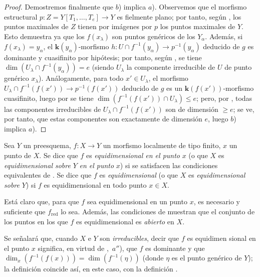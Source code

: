 \begin{proof}
Demostremos finalmente que $b$) implica $a$).
Observemos que el morfismo estructural $p:Z=Y[T_1,\ldots,T_e]\to Y$ es fielmente plano; por tanto, según , los puntos maximales de $Z$ tienen por imágenes por $p$ los puntos maximales de $Y$. Esto demuestra ya que los $f(x_\lambda)$ son puntos genéricos de los $Y_\alpha$.
Además, si $f(x_\lambda)=y_\alpha$, el $\boldsymbol{k}(y_\alpha)$-morfismo $h:U\cap f^{-1}(y_\alpha)\to p^{-1}(y_\alpha)$ deducido de $g$ es dominante y cuasifinito por hipótesis; por tanto, según , se tiene $\dim(U_\lambda\cap f^{-1}(y_\alpha))=e$ (siendo $U_\lambda$ la componente irreducible de $U$ de punto genérico $x_\lambda$).
Análogamente, para todo $x'\in U_\lambda$, el morfismo $U_\lambda\cap f^{-1}(f(x'))\to p^{-1}(f(x'))$ deducido de $g$ es un $\boldsymbol{k}(f(x'))$-morfismo cuasifinito, luego por  se tiene $\dim(f^{-1}(f(x'))\cap U_\lambda)\leq e$; pero, por , todas las componentes irreducibles de $U_\lambda\cap f^{-1}(f(x'))$ son de dimensión $\geq e$; se ve, por tanto, que estas componentes son exactamente de dimensión $e$, luego $b$) implica $a$).
\end{proof}

\begin{definition}[13.3.2]
\label{IV.13.3.2}
Sea $Y$ un preesquema, $f:X\to Y$ un morfismo localmente de tipo finito, $x$ un punto de $X$.
Se dice que $f$ es \emph{equidimensional en el punto} $x$ (o que $X$ es \emph{equidimensional sobre} $Y$ \emph{en el punto} $x$) si se satisfacen las condiciones equivalentes de .
Se dice que $f$ es \emph{equidimensional} (o que $X$ es \emph{equidimensional sobre} $Y$) si $f$ es equidimensional en todo punto $x\in X$.
\end{definition}

Está claro que, para que $f$ sea equidimensional en un punto $x$, es necesario y suficiente que $f_{\mathrm{red}}$ lo sea.
Además, las condiciones de  muestran que el conjunto de los puntos en los que $f$ es equidimensional es \emph{abierto} en $X$.

Se señalará que, cuando $X$ e $Y$ son \emph{irreducibles}, decir que $f$ es equidimen%
sional en el punto $x$ significa, en virtud de ,~$a''$), que $f$ es dominante y que $\dim_x(f^{-1}(f(x)))=\dim(f^{-1}(\eta))$ (donde $\eta$ es el punto genérico de $Y$); la definición  coincide así, en este caso, con la definición .

